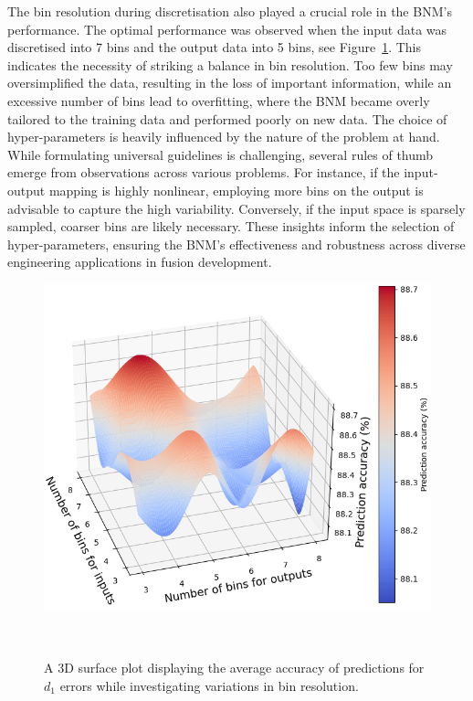 \documentclass[journal]{IEEEtran}
\begin{document}
The bin resolution during discretisation also played a crucial role in the BNM's performance. The optimal performance was observed when the input data was discretised into 7 bins and the output data into 5 bins, see Figure~\ref{fig:3D_SA_trimmed_39_D1}. This indicates the necessity of striking a balance in bin resolution. Too few bins may oversimplified the data, resulting in the loss of important information, while an excessive number of bins lead to overfitting, where the BNM became overly tailored to the training data and performed poorly on new data. The choice of hyper-parameters is heavily influenced by the nature of the problem at hand. While formulating universal guidelines is challenging, several rules of thumb emerge from observations across various problems. For instance, if the input-output mapping is highly nonlinear, employing more bins on the output is advisable to capture the high variability. Conversely, if the input space is sparsely sampled, coarser bins are likely necessary. These insights inform the selection of hyper-parameters, ensuring the BNM's effectiveness and robustness across diverse engineering applications in fusion development.

\begin{figure}[h]
    \centering
    \includegraphics[width=0.9\columnwidth]{figures/validation_plots/PROCESS/SA_3D_trimmed_39.png}
    \caption{\small A 3D surface plot displaying the average accuracy of predictions for $d_{1}$ errors while investigating variations in bin resolution.}~\label{fig:3D_SA_trimmed_39_D1}
\end{figure}
\end{document}
